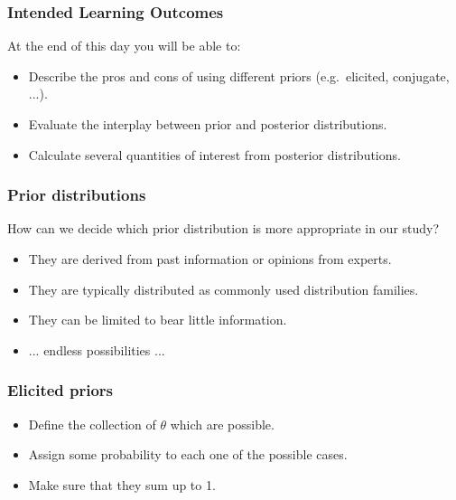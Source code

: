 \documentclass{beamer}
\newcommand{\1}{\ensuremath{\mathbf{1}}}
\begin{document}
%
%
%
\begin{frame}\frametitle{Intended Learning Outcomes}
	At the end of this day you will be able to:
	\begin{itemize}
		\item Describe the pros and cons of using different priors (e.g.\ elicited, conjugate, ...).
		\item Evaluate the interplay between prior and posterior distributions.
		\item Calculate several quantities of interest from posterior distributions.
	\end{itemize}
\end{frame}
%
%
%
\begin{frame}\frametitle{Prior distributions}
	How can we decide which prior distribution is more appropriate in our study?
	\begin{itemize}
		\item They are derived from past information or opinions from experts.
		\item They are typically distributed as commonly used distribution families.
		\item They can be limited to bear little information.
		\item ... endless possibilities ...
	\end{itemize}
\end{frame}
%
%
%
\begin{frame}\frametitle{Elicited priors}
	\begin{block}{}
		\begin{itemize}
			\item Define the collection of $\theta$ which are possible.
			\item Assign some probability to each one of the possible cases.
			\item Make sure that they sum up to 1.
		\end{itemize}
	\end{block}
\end{frame}
\end{document}
